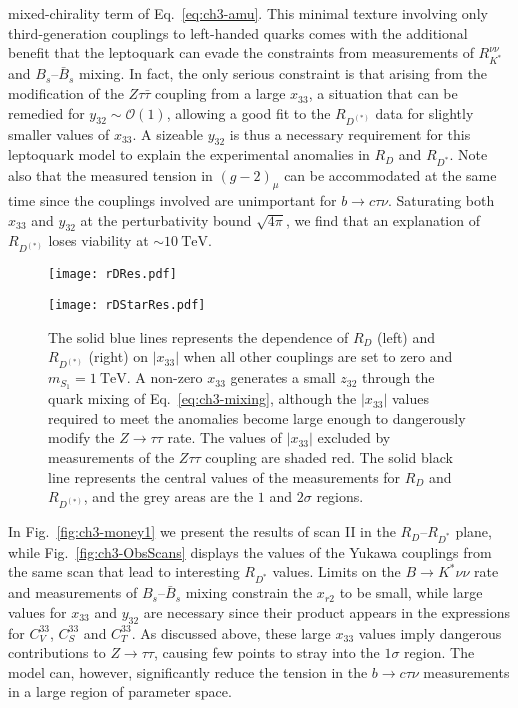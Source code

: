 mixed-chirality term of Eq.~\eqref{eq:ch3-amu}. This minimal texture involving
only third-generation couplings to left-handed quarks comes with the additional
benefit that the leptoquark can evade the constraints from measurements of
$R_{K^{*}}^{\nu\nu}$ and $B_s$--$\bar{B}_s$ mixing. In fact, the only serious
constraint is that arising from the modification of the $Z\tau\bar{\tau}$
coupling from a large $x_{33}$, a situation that can be remedied for
$y_{32} \sim \mathscr{O}(1)$, allowing a good fit to the $R_{D^{(*)}}$ data for
slightly smaller values of $x_{33}$. A sizeable $y_{32}$ is thus a necessary
requirement for this leptoquark model to explain the experimental anomalies in
$R_D$ and $R_{D^*}$. Note also that the measured tension in $(g-2)_\mu$ can be
accommodated at the same time since the couplings involved are unimportant for
$b \to c \tau \nu$. Saturating both $x_{33}$ and $y_{32}$ at the perturbativity
bound $\sqrt{4\pi}$, we find that an explanation of $R_{D^{(*)}}$ loses
viability at $\sim \SI{10}{\TeV}$.

\begin{figure}[t]
  \centering
  \begin{minipage}[t]{0.45\linewidth}
    \centering \texttt{[image: rDRes.pdf]}
  \end{minipage}
  \hfill
  \begin{minipage}[t]{0.45\linewidth}
    \centering \texttt{[image: rDStarRes.pdf]}
  \end{minipage}
  \caption[The solid blue lines represents the dependence of $R_D$ (left) and
  $R_{D^{(*)}}$ (right) on $|x_{33}|$ when all other couplings are set to zero
  and $m_{S_{1}} = \SI{1}{\TeV}$.]{The solid blue lines represents the dependence
    of $R_D$ (left) and $R_{D^{(*)}}$ (right) on $|x_{33}|$ when all other
    couplings are set to zero and $m_{S_{1}} = \SI{1}{\TeV}$. A non-zero $x_{33}$
    generates a small $z_{32}$ through the quark mixing of
    Eq.~\eqref{eq:ch3-mixing}, although the $|x_{33}|$ values required to meet the
    anomalies become large enough to dangerously modify the $Z \to \tau\tau$
    rate. The values of $|x_{33}|$ excluded by measurements of the $Z\tau\tau$
    coupling are shaded red. The solid black line represents the central values
    of the measurements for $R_D$ and $R_{D^{(*)}}$, and the grey areas are the
    $1$ and $2\sigma$ regions.}
  \label{fig:ch3-rDRes}
\end{figure}

In Fig.~\ref{fig:ch3-money1} we present the results of scan II in the
$R_D$--$R_{D^*}$ plane, while Fig.~\ref{fig:ch3-ObsScans} displays the values of
the Yukawa couplings from the same scan that lead to interesting $R_{D^{*}}$ values.
Limits on the $B \to K^{*} \nu \nu$ rate and measurements of $B_s$--$\bar{B}_s$
mixing constrain the $x_{r2}$ to be small, while large values for $x_{33}$ and
$y_{32}$ are necessary since their product appears in the expressions for
$C_{ V }^{33}$, $C_{ S }^{33}$ and $C_{ T }^{33}$. As discussed above, these
large $x_{33}$ values imply dangerous contributions to $Z \to \tau \tau$,
causing few points to stray into the $1\sigma$ region. The model can, however,
significantly reduce the tension in the $b\to c \tau \nu$ measurements in a
large region of parameter space.

